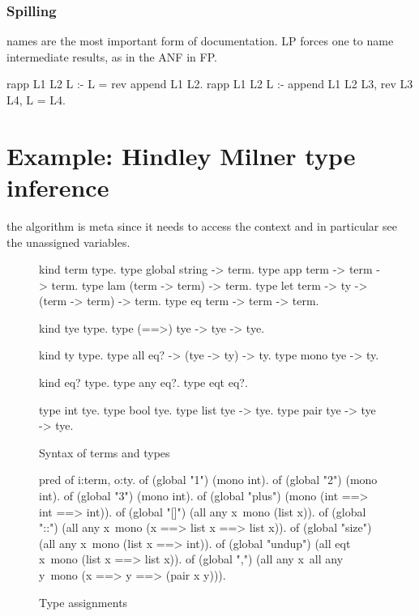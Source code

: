 \documentclass[a4paper, 11pt]{book}
\begin{document}
\subsubsection{Spilling}

names are the most important form of documentation.
LP forces one to name intermediate results, as in the ANF
in FP.

\begin{elpicode}
rapp L1 L2 L :- L = {rev {append L1 L2}}.
rapp L1 L2 L :- append L1 L2 L3, rev L3 L4, L = L4.
\end{elpicode}

\section{Example: Hindley Milner type inference}

the algorithm is meta since it needs to access the context and
in particular see the unassigned variables.

\begin{figure}
\begin{elpicode}
kind term type.
type global  string -> term.
type app term -> term -> term.
type lam (term -> term) -> term.
type let term -> ty -> (term -> term) -> term.
type eq  term -> term -> term.

kind tye type.
type (==>) tye -> tye -> tye.  

kind ty type.
type all    eq? -> (tye -> ty) -> ty.
type mono   tye -> ty.

kind eq? type.
type any eq?. %
type eqt eq?. %

type int   tye.
type bool  tye.
type list  tye -> tye.
type pair  tye -> tye -> tye.
\end{elpicode}
\caption[syntax]{Syntax of terms and types\label{hm:syntax}}
\end{figure}


\begin{figure}
\begin{elpicode}
pred of i:term, o:ty.
of (global "1")      (mono int).
of (global "2")      (mono int).
of (global "3")      (mono int).
of (global "plus")   (mono (int ==> int ==> int)).
of (global "[]")    (all any x\ mono (list x)).
of (global "::")    (all any x\ mono (x ==> list x ==> list x)).
of (global "size")  (all any x\ mono (list x ==> int)).
of (global "undup") (all eqt x\ mono (list x ==> list x)).
of (global ",")     (all any x\ all any y\ mono (x ==> y ==> (pair x y))).
\end{elpicode}
\caption[type assignments]{Type assignments\label{hm:env}}
\end{figure}
  
\end{document}
